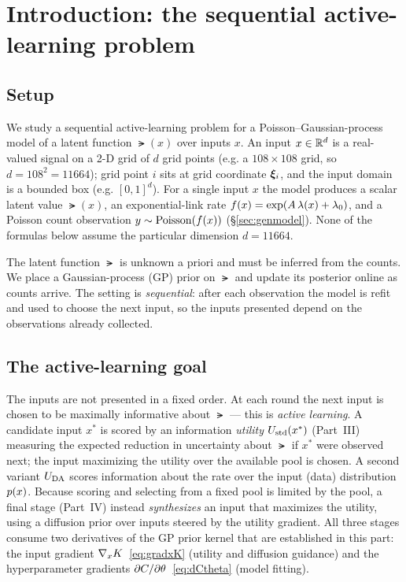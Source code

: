 
\section{Introduction: the sequential active-learning problem}
\label{sec:intro}

\subsection{Setup}

We study a sequential active-learning problem for a Poisson--Gaussian-process
model of a latent function $\lat(x)$ over inputs $x$. An input
$x\in\mathbb{R}^{d}$ is a real-valued signal on a 2-D grid of $d$ grid points (e.g. a
$108\times108$ grid, so $d=108^2=11664$); grid point $i$ sits at grid coordinate
$\bm{\xi}_i$, and the input domain is a bounded box (e.g. $[0,1]^{d}$). For a single
input $x$ the model produces a scalar latent value $\lat(x)$, an exponential-link
rate $f(x)=\exp(A\,\lambda(x)+\lambda_{0})$, and a Poisson count observation
$y\sim\mathrm{Poisson}(f(x))$ (\S\ref{sec:genmodel}). None of the formulas below assume
the particular dimension $d=11664$.

The latent function $\lat$ is unknown a priori and must be inferred from the
counts. We place a Gaussian-process (GP) prior on $\lat$ and update its posterior
online as counts arrive. The setting is \emph{sequential}: after each observation
the model is refit and used to choose the next input, so the inputs presented
depend on the observations already collected.

\subsection{The active-learning goal}

The inputs are not presented in a fixed order. At each round the next input is
chosen to be maximally informative about $\lat$ --- this is \emph{active
learning}. A candidate input $x^{*}$ is scored by an information \emph{utility}
$U_{\mathrm{std}}(x^{*})$ (Part~III) measuring the expected reduction in uncertainty about
$\lat$ if $x^{*}$ were observed next; the input maximizing the utility over the
available pool is chosen. A second variant $U_{\mathrm{DA}}$ scores information about the rate
over the input (data) distribution $p(x)$. Because scoring and selecting from a
fixed pool is limited by the pool, a final stage (Part~IV) instead
\emph{synthesizes} an input that maximizes the utility, using a diffusion prior
over inputs steered by the utility gradient. All three stages consume two
derivatives of the GP prior kernel that are established in this part: the input
gradient $\nabla_xK$~\eqref{eq:gradxK} (utility and diffusion guidance) and the
hyperparameter gradients $\partial C/\partial\theta$~\eqref{eq:dCtheta} (model
fitting).

